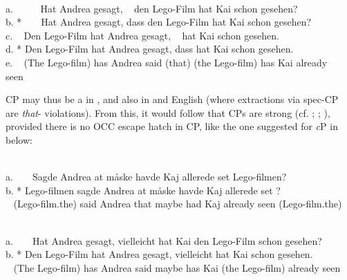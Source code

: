 \documentclass[output=paper]{LSP/langsci}
\begin{document}
\ea%
  \let\eachwordone=\small 
  \let\eachwordtwo=\small
  \let\eachwordthree=\small
  \let\eachwordfour=\small
  \let\eachwordfive=\small
    \label{ex:vikner:6}
    \\     
    \glllll a. ~  ~   ~ Hat  Andrea  gesagt,  ~  {den Lego-Film}  hat  Kai  schon  {\longrule}  gesehen?\\
	  b. *  ~  ~ Hat  Andrea  gesagt,  dass  {den Lego-Film}  hat  Kai  schon  {\longrule}  gesehen?\\
	  c. ~  Den Lego-Film  hat  Andrea  gesagt,  ~  \underline{}  hat  Kai  schon  {\longrule}  gesehen.\\ 
	  d.  *  Den Lego-Film  hat  Andrea  gesagt,  dass  \underline{}  hat  Kai  schon  {\longrule}  gesehen.\\
	  e. ~  ({The} {Lego-film})  {has}  {Andrea}  {said}  ({that})  ({the Lego-film})  {has}  {Kai}  {already}  ~  {seen}\\
    \z 


CP may thus be a  in , and also in  and English (where extractions via spec-CP are \textit{that}{}- violations). From this, it would follow that CPs are strong  (cf. \citealt[111]{Holmberg1986}; \citealt[493ff]{MüllerSternefeld1993}; \citealt{SheehanHinzen2011}), provided there is no OCC escape hatch in CP, like the one suggested for \textit{c}P in  below: 

\ea%
    \label{ex:vikner:7}  
\let\eachwordone=\small 
\let\eachwordtwo=\small
\let\eachwordthree=\small
\small
    \\
    \glll a. ~   ~               Sagde Andrea at måske havde Kaj allerede set Lego-filmen?\\
	  b. *   Lego-filmen      sagde Andrea at måske havde Kaj allerede set {\longrule}?\\
	  {} ~  ({Lego-film.the}) {said} {Andrea} {that} {maybe} {had} {Kaj} {already} {seen} ({Lego-film.the})\\
    \z

	


\ea%
    \label{ex:vikner:8}    
    \let\eachwordone=\small 
\let\eachwordtwo=\small
\let\eachwordthree=\small
\small
    \\
    \glll  a. ~   ~  Hat Andrea gesagt, vielleicht hat Kai {den Lego-Film} schon gesehen?\\
	  b. * {Den Lego-Film} hat Andrea gesagt, vielleicht hat Kai {\longrule}{\longrule} schon gesehen. \\
 ~ {} ({The Lego-film}) {has} {Andrea} {said} {maybe} {has} {Kai} ({the Lego-film}) {already} {seen}\\
    \z
\end{document}
